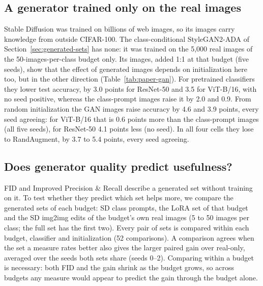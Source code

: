 
\subsection{A generator trained only on the real images}
\label{sec:results-gan}
Stable Diffusion was trained on billions of web images, so its images carry knowledge from outside
CIFAR-100. The class-conditional StyleGAN2-ADA of Section~\ref{sec:generated-sets} has none: it was trained on
the 5{,}000 real images of the 50-images-per-class budget only. Its images, added 1:1 at that budget (five
seeds), show that the effect of generated images depends on initialization here too, but in the other
direction (Table~\ref{tab:paper-gan}). For pretrained classifiers they lower test accuracy, by 3.0 points for
ResNet-50 and 3.5 for ViT-B/16, with no seed positive, whereas the class-prompt images raise it by 2.0 and 0.9.
From random initialization the GAN images raise accuracy by 4.6 and 3.9 points, every seed agreeing: for
ViT-B/16 that is 0.6 points more than the class-prompt images (all five seeds), for ResNet-50 4.1 points less
(no seed). In all four cells they lose to RandAugment, by 3.7 to 5.4 points, every seed agreeing.


\subsection{Does generator quality predict usefulness?}
\label{sec:pool-utility}
FID and Improved Precision \& Recall describe a generated set without training on it. To test whether they
predict which set helps more, we compare the generated sets of each budget: SD class prompts, the LoRA set
of that budget and the SD img2img edits of the budget's own real images (5 to 50 images per class; the full
set has the first two). Every pair of sets is compared within each budget, classifier and initialization
(52 comparisons). A comparison agrees when the set a measure rates better also gives the larger paired gain
over real-only, averaged over the seeds both sets share (seeds 0--2). Comparing within a budget is
necessary: both FID and the gain shrink as the budget grows, so across budgets any measure would appear to
predict the gain through the budget alone.

